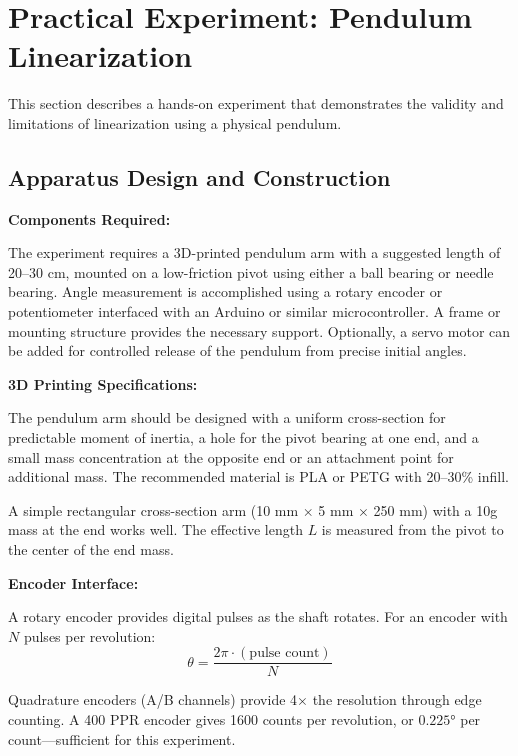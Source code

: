 \section{Practical Experiment: Pendulum Linearization}
\label{sec:linearization_experiment}

This section describes a hands-on experiment that demonstrates the validity and limitations of linearization using a physical pendulum.

\subsection{Apparatus Design and Construction}

\textbf{Components Required:}

The experiment requires a 3D-printed pendulum arm with a suggested length of 20--30 cm, mounted on a low-friction pivot using either a ball bearing or needle bearing. Angle measurement is accomplished using a rotary encoder or potentiometer interfaced with an Arduino or similar microcontroller. A frame or mounting structure provides the necessary support. Optionally, a servo motor can be added for controlled release of the pendulum from precise initial angles.

\textbf{3D Printing Specifications:}

The pendulum arm should be designed with a uniform cross-section for predictable moment of inertia, a hole for the pivot bearing at one end, and a small mass concentration at the opposite end or an attachment point for additional mass. The recommended material is PLA or PETG with 20--30\% infill.

A simple rectangular cross-section arm (10 mm $\times$ 5 mm $\times$ 250 mm) with a 10g mass at the end works well. The effective length $L$ is measured from the pivot to the center of the end mass.

\textbf{Encoder Interface:}

A rotary encoder provides digital pulses as the shaft rotates. For an encoder with $N$ pulses per revolution:
\begin{equation}
\theta = \frac{2\pi \cdot (\text{pulse count})}{N}
\end{equation}

Quadrature encoders (A/B channels) provide 4$\times$ the resolution through edge counting. A 400 PPR encoder gives 1600 counts per revolution, or $0.225°$ per count---sufficient for this experiment.

